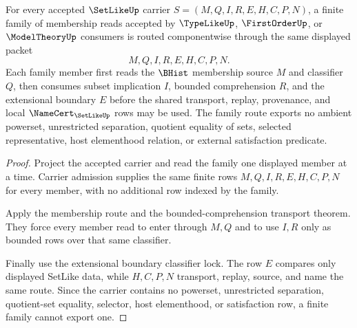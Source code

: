\begin{theorem}
\label{thm:setlike-finite-family-membership-route}
For every accepted $\SetLikeUp$ carrier $S=(M,Q,I,R,E,H,C,P,N)$, a finite family of membership reads accepted by $\TypeLikeUp$, $\FirstOrderUp$, or $\ModelTheoryUp$ consumers is routed componentwise through the same displayed packet
$$
M,Q,I,R,E,H,C,P,N .
$$
Each family member first reads the $\BHist$ membership source $M$ and classifier $Q$, then consumes subset implication $I$, bounded comprehension $R$, and the extensional boundary $E$ before the shared transport, replay, provenance, and local $\NameCert_{\SetLikeUp}$ rows may be used. The family route exports no ambient powerset, unrestricted separation, quotient equality of sets, selected representative, host elementhood relation, or external satisfaction predicate.
\end{theorem}
\begin{proof}
Project the accepted carrier and read the family one displayed member at a time. Carrier admission supplies the same finite rows $M,Q,I,R,E,H,C,P,N$ for every member, with no additional row indexed by the family.

Apply the membership route and the bounded-comprehension transport theorem. They force every member read to enter through $M,Q$ and to use $I,R$ only as bounded rows over that same classifier.

Finally use the extensional boundary classifier lock. The row $E$ compares only displayed SetLike data, while $H,C,P,N$ transport, replay, source, and name the same route. Since the carrier contains no powerset, unrestricted separation, quotient-set equality, selector, host elementhood, or satisfaction row, a finite family cannot export one.
\end{proof}

